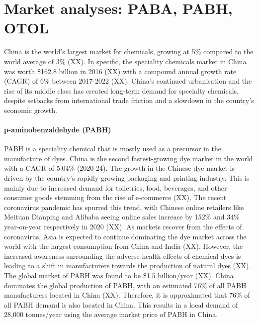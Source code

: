 \section{Market analyses: PABA, PABH, OTOL}
China is the world’s largest market for chemicals, growing at 5\% compared to the world average of 3\% (XX). In specific, the speciality chemicals market in China was worth \$162.8 billion in 2016 (XX) with a compound annual growth rate (CAGR) of 6\% between 2017-2022 (XX). China’s continued urbanisation and the rise of its middle class has created long-term demand for specialty chemicals, despite setbacks from international trade friction and a slowdown in the country’s economic growth.

\paragraph{p-aminobenzaldehyde (PABH)}
PABH is a speciality chemical that is mostly used as a precursor in the manufacture of dyes. China is the second fastest-growing dye market in the world with a CAGR of 5.04\% (2020-24). The growth in the Chinese dye market is driven by the country’s rapidly growing packaging and printing industry. This is mainly due to increased demand for toiletries, food, beverages, and other consumer goods stemming from the rise of e-commerce (XX). The recent coronavirus pandemic has spurred this trend, with Chinese online retailers like Meituan Dianping and Alibaba seeing online sales increase by 152\% and 34\% year-on-year respectively in 2020 (XX). As markets recover from the effects of coronavirus, Asia is expected to continue dominating the dye market across the world with the largest consumption from China and India (XX). However, the increased awareness surrounding the adverse health effects of chemical dyes is leading to a shift in manufacturers towards the production of natural dyes (XX). The global market of PABH was found to be \$1.5 billion/year (XX). China dominates the global production of PABH, with an estimated 76\% of all PABH manufacturers located in China (XX). Therefore, it is approximated that 76\% of all PABH demand is also located in China. This results in a local demand of 28,000 tonnes/year using the average market price of PABH in China.

